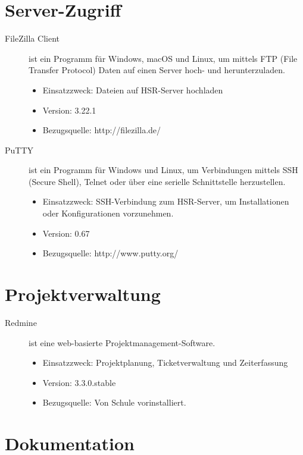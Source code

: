 \newpage
\section{Server-Zugriff}

\begin{description}
	\item [FileZilla Client] ist ein Programm für Windows, macOS und Linux, um mittels FTP (File Transfer Protocol) Daten auf einen Server hoch- und herunterzuladen. \cite{wikipedia_filezilla}
	\begin{itemize}
		\item Einsatzzweck: Dateien auf HSR-Server hochladen
		\item Version: 3.22.1
		\item Bezugsquelle: http://filezilla.de/
	\end{itemize}
	
	
	\item [PuTTY] ist ein Programm für Windows und Linux, um Verbindungen mittels SSH (Secure Shell), Telnet oder über eine serielle Schnittstelle herzustellen. \cite{wikipedia_putty}
	\begin{itemize}
		\item Einsatzzweck: SSH-Verbindung zum HSR-Server, um Installationen oder Konfigurationen vorzunehmen.
		\item Version: 0.67
		\item Bezugsquelle: http://www.putty.org/
	\end{itemize}
\end{description}



\section{Projektverwaltung}

\begin{description}
	\item [Redmine] ist eine web-basierte Projektmanagement-Software.
	\begin{itemize}
		\item Einsatzzweck: Projektplanung, Ticketverwaltung und Zeiterfassung
		\item Version: 3.3.0.stable
		\item Bezugsquelle: Von Schule vorinstalliert.
	\end{itemize}
\end{description}


\newpage
\section{Dokumentation}

